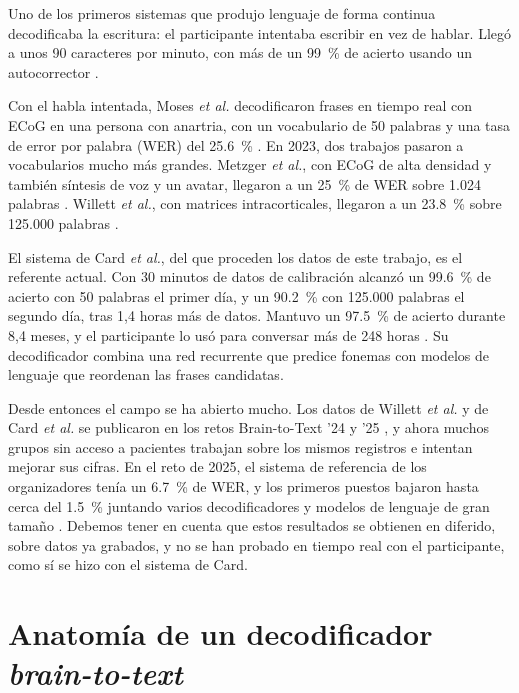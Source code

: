 Uno de los primeros sistemas que produjo lenguaje de forma continua decodificaba la escritura: el participante intentaba escribir en vez de hablar. Llegó a unos 90 caracteres por minuto, con más de un \SI{99}{\percent} de acierto usando un autocorrector \cite{willett2021}.

Con el habla intentada, Moses \textit{et al.} decodificaron frases en tiempo real con ECoG en una persona con anartria, con un vocabulario de 50 palabras y una tasa de error por palabra (WER) del \SI{25.6}{\percent} \cite{moses2021}. En 2023, dos trabajos pasaron a vocabularios mucho más grandes. Metzger \textit{et al.}, con ECoG de alta densidad y también síntesis de voz y un avatar, llegaron a un \SI{25}{\percent} de WER sobre 1.024 palabras \cite{metzger2023}. Willett \textit{et al.}, con matrices intracorticales, llegaron a un \SI{23.8}{\percent} sobre 125.000 palabras \cite{willett2023}.

El sistema de Card \textit{et al.}, del que proceden los datos de este trabajo, es el referente actual. Con 30 minutos de datos de calibración alcanzó un \SI{99.6}{\percent} de acierto con 50 palabras el primer día, y un \SI{90.2}{\percent} con 125.000 palabras el segundo día, tras 1,4 horas más de datos. Mantuvo un \SI{97.5}{\percent} de acierto durante 8,4 meses, y el participante lo usó para conversar más de 248 horas \cite{card2024}. Su decodificador combina una red recurrente que predice fonemas con modelos de lenguaje que reordenan las frases candidatas.

Desde entonces el campo se ha abierto mucho. Los datos de Willett \textit{et al.} y de Card \textit{et al.} se publicaron en los retos Brain-to-Text '24 y '25 \cite{b2t24lessons,b2t25}, y ahora muchos grupos sin acceso a pacientes trabajan sobre los mismos registros e intentan mejorar sus cifras. En el reto de 2025, el sistema de referencia de los organizadores tenía un \SI{6.7}{\percent} de WER, y los primeros puestos bajaron hasta cerca del \SI{1.5}{\percent} juntando varios decodificadores y modelos de lenguaje de gran tamaño \cite{b2t25}. Debemos tener en cuenta que estos resultados se obtienen en diferido, sobre datos ya grabados, y no se han probado en tiempo real con el participante, como sí se hizo con el sistema de Card.

\section{Anatomía de un decodificador \textit{brain-to-text}}
\label{sec:sota-anatomia}

